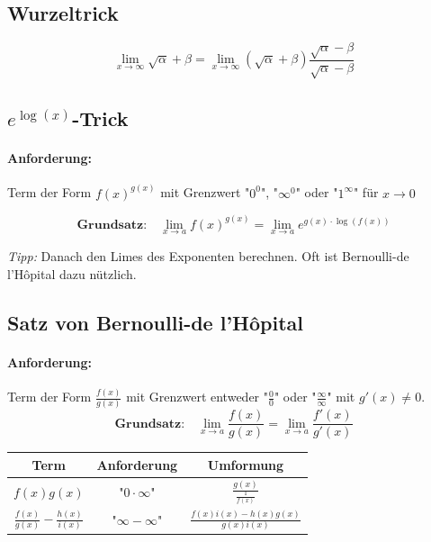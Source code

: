 \documentclass[11pt]{article}
\begin{document}
\subsection{Wurzeltrick}

\begin{equation*}
	\lim_{x\to\infty} \sqrt{\alpha}+\beta = \lim_{x\to\infty}(\sqrt{\alpha}+\beta)\frac{\sqrt{\alpha}-\beta}{\sqrt{\alpha}-\beta}
\end{equation*}

\subsection{$e^{\log(x)}$-Trick}

\paragraph{Anforderung:}Term der Form $f(x)^{g(x)}$ mit Grenzwert "$0^0$", "$\infty^0$" oder "$1^\infty$" f{\"u}r $x \to 0$

\begin{equation*}
	\textbf{Grundsatz:}\quad\lim_{x\to a}f(x)^{g(x)} = \lim_{x\to a}e^{g(x) \cdot \log(f(x))}
\end{equation*}

\emph{Tipp:} Danach den Limes des Exponenten berechnen. Oft ist Bernoulli-de l'H{\^o}pital dazu n{\"u}tzlich.

\subsection{Satz von Bernoulli-de l'H{\^o}pital}

\paragraph{Anforderung:}Term der Form $\frac{f(x)}{g(x)}$ mit Grenzwert entweder "$\frac{0}{0}$" oder "$\frac{\infty}{\infty}$" mit $g'(x) \neq 0$. \\

\begin{equation*}
	\textbf{Grundsatz:}\quad\lim_{x\to a}\frac{f(x)}{g(x)} = \lim_{x\to a}\frac{f'(x)}{g'(x)}
\end{equation*}

\begin{table}[H]
\centering
\begin{tabular}{|c|c|c|}
\hline
\textbf{Term} & \textbf{Anforderung} & \textbf{Umformung} \\ \hline
$f(x)g(x)$              & "$0\cdot\infty$"                     & $\frac{g(x)}{\frac{1}{f(x)}}$          \\ \hline 
$\frac{f(x)}{g(x)} - \frac{h(x)}{i(x)}$ & "$\infty - \infty$"  & $\frac{f(x)i(x) - h(x)g(x)}{g(x)i(x)}$ \\ \hline      
\end{tabular}
\end{table}
\end{document}
